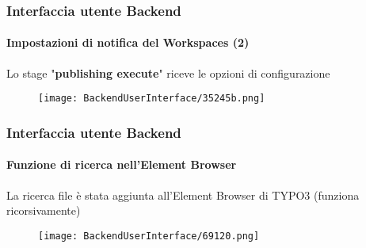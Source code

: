\begin{frame}[fragile]
	\frametitle{Interfaccia utente Backend}
	\framesubtitle{Impostazioni di notifica del Workspaces (2)}

	Lo stage "\textbf{publishing execute}" riceve le opzioni di configurazione

	\begin{figure}
		\texttt{[image: BackendUserInterface/35245b.png]}
	\end{figure}

\end{frame}

\begin{frame}[fragile]
	\frametitle{Interfaccia utente Backend}
	\framesubtitle{Funzione di ricerca nell'Element Browser}

	La ricerca file è stata aggiunta all'Element Browser di TYPO3 (funziona ricorsivamente)

	\begin{figure}
		\texttt{[image: BackendUserInterface/69120.png]}
	\end{figure}

\end{frame}

